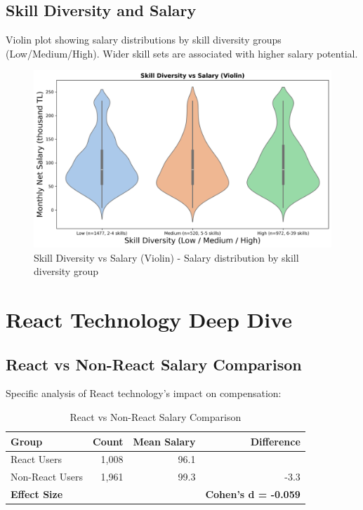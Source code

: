 \documentclass[12pt,a4paper]{article}
\begin{document}
\subsection{Skill Diversity and Salary}

Violin plot showing salary distributions by skill diversity groups (Low/Medium/High). Wider skill sets are associated with higher salary potential.

\begin{figure}[H]
    \centering
    \includegraphics[width=\textwidth]{figures/violin_skill_diversity.png}
    \caption{Skill Diversity vs Salary (Violin) - Salary distribution by skill diversity group}
\end{figure}

\section{React Technology Deep Dive}

\subsection{React vs Non-React Salary Comparison}
Specific analysis of React technology's impact on compensation:

\begin{table}[H]
\centering
\begin{tabular}{lrrr}
\toprule
\textbf{Group} & \textbf{Count} & \textbf{Mean Salary} & \textbf{Difference} \\
\midrule
React Users & 1,008 & 96.1 & \\
Non-React Users & 1,961 & 99.3 & -3.3 \\
\midrule
\textbf{Effect Size} & & & \textbf{Cohen's d = -0.059} \\
\bottomrule
\end{tabular}
\caption{React vs Non-React Salary Comparison}
\end{table}
\end{document}
